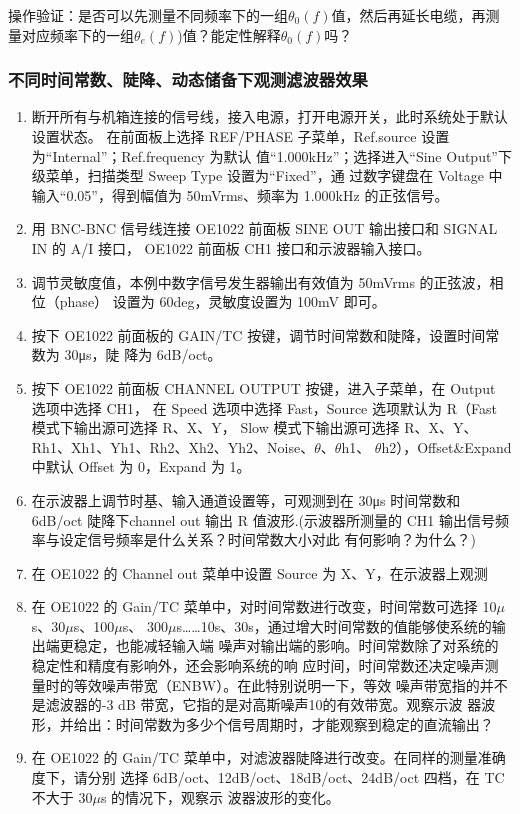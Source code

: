 \documentclass[11pt,a4paper]{ctexart}
\begin{document}
\begin{enumerate}[(1)]
\begin{table}[H]
\begin{tabular}{|  p{2cm} | p{2cm} | p{2cm} | p{2cm} |}
			\end{tabular}
		\end{table}
		操作验证：是否可以先测量不同频率下的一组$\theta_0(f)$值，然后再延长电缆，再测量对应频率下的一组$\theta_e(f)$)值？能定性解释$\theta_0(f)$吗？
\end{enumerate}
		\subsubsection{不同时间常数、陡降、动态储备下观测滤波器效果}
		\begin{enumerate}[(1)]
		\item 断开所有与机箱连接的信号线，接入电源，打开电源开关，此时系统处于默认设置状态。
		在前面板上选择 REF/PHASE 子菜单，Ref.source 设置为“Internal”；Ref.frequency 为默认
		值“1.000kHz”；选择进入“Sine Output”下级菜单，扫描类型 Sweep Type 设置为“Fixed”，通
		过数字键盘在 Voltage 中输入“0.05”，得到幅值为 50mVrms、频率为 1.000kHz 的正弦信号。
		\item 用 BNC-BNC 信号线连接 OE1022 前面板 SINE OUT 输出接口和 SIGNAL IN 的 A/I 接口，
		OE1022 前面板 CH1 接口和示波器输入接口。
		\item 调节灵敏度值，本例中数字信号发生器输出有效值为 50mVrms 的正弦波，相位（phase）
		设置为 60deg，灵敏度设置为 100mV 即可。
		\item 按下 OE1022 前面板的 GAIN/TC 按键，调节时间常数和陡降，设置时间常数为 30μs，陡
		降为 6dB/oct。
		\item 按下 OE1022 前面板 CHANNEL OUTPUT 按键，进入子菜单，在 Output 选项中选择 CH1， 在 Speed 选项中选择 Fast，Source 选项默认为 R（Fast 模式下输出源可选择 R、X、Y，
		Slow 模式下输出源可选择 R、X、Y、Rh1、Xh1、Yh1、Rh2、Xh2、Yh2、Noise、$\theta$、$\theta$h1、 $\theta$h2），Offset\&Expand 中默认 Offset 为 0，Expand 为 1。
		\item 在示波器上调节时基、输入通道设置等，可观测到在 30μs 时间常数和 6dB/oct 陡降下channel out 输出 R 值波形.(示波器所测量的 CH1 输出信号频率与设定信号频率是什么关系？时间常数大小对此
		有何影响？为什么？)
		
		\item 在 OE1022 的 Channel out 菜单中设置 Source 为 X、Y，在示波器上观测
		
		\item 在 OE1022 的 Gain/TC 菜单中，对时间常数进行改变，时间常数可选择 10$\mu$s、30$\mu$s、100$\mu$s、
		300$\mu$s……10s、30s，通过增大时间常数的值能够使系统的输出端更稳定，也能减轻输入端
		噪声对输出端的影响。时间常数除了对系统的稳定性和精度有影响外，还会影响系统的响
		应时间，时间常数还决定噪声测量时的等效噪声带宽（ENBW）。在此特别说明一下，等效
		噪声带宽指的并不是滤波器的-3 dB 带宽，它指的是对高斯噪声10的有效带宽。观察示波
		器波形，并给出：时间常数为多少个信号周期时，才能观察到稳定的直流输出？
		
		\item 在 OE1022 的 Gain/TC 菜单中，对滤波器陡降进行改变。在同样的测量准确度下，请分别
		选择 6dB/oct、12dB/oct、18dB/oct、24dB/oct 四档，在 TC 不大于 30$\mu$s 的情况下，观察示
		波器波形的变化。
\end{enumerate}
\end{document}
